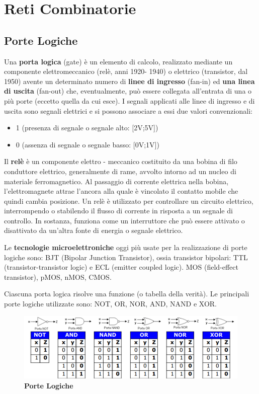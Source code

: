 \documentclass[12pt]{article}
\begin{document}
\newpage
\section{Reti Combinatorie}
\subsection{Porte Logiche}
Una \textbf{porta logica} (gate) è un elemento di calcolo, realizzato mediante un componente elettromeccanico (relè, anni 1920- 1940) o elettrico (transistor, dal 1950) avente un determinato numero di \textbf{linee di ingresso }(fan-in) ed \textbf{una linea di uscita }(fan-out) che, eventualmente, può essere collegata all’entrata di una o più porte (eccetto quella da cui esce). I segnali applicati alle linee di ingresso e di uscita sono segnali elettrici e si possono associare a essi due valori convenzionali:
\begin{itemize}
    \item 1 (presenza di segnale o segnale alto: [2V;5V])
    \item 0 (assenza di segnale o segnale basso: [0V;1V]) 
\end{itemize}
\par\medskip\noindent
Il \textbf{relè} è un componente elettro - meccanico costituito da una bobina di filo conduttore elettrico, generalmente di rame, avvolto intorno ad un nucleo di materiale ferromagnetico. Al passaggio di corrente elettrica nella bobina, l'elettromagnete attrae l'ancora alla quale è vincolato il contatto mobile che quindi cambia posizione. Un relè è utilizzato per controllare un circuito elettrico, interrompendo o stabilendo il flusso di corrente in risposta a un segnale di controllo. In sostanza, funziona come un interruttore che può essere attivato o disattivato da un'altra fonte di energia o segnale elettrico.\par\medskip\noindent
Le\textbf{ tecnologie microelettroniche} oggi più usate per la realizzazione di porte logiche sono: BJT (Bipolar Junction Transistor), ossia transistor bipolari: TTL (transistor-transistor logic) e ECL (emitter coupled logic). MOS (field-effect transistor), pMOS, nMOS, CMOS.\par\medskip\noindent
Ciascuna porta logica risolve una funzione (o tabella della verità). Le principali porte logiche utilizzate sono: NOT, OR, NOR, AND, NAND e XOR.\par\medskip\noindent
   \begin{figure}[h]
      \centering
      \includegraphics[width=1\linewidth]{Porte Logiche.png}
      \caption{\textbf{Porte Logiche}}
      \label{fig:enter-label}
    \end{figure}
\end{document}
